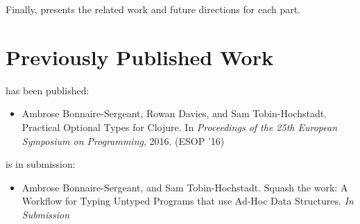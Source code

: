 Finally,  presents the related work and future directions for each part.

\section{Previously Published Work}

 has been published:

\begin{itemize}
  \item Ambrose Bonnaire-Sergeant, Rowan Davies, and Sam Tobin-Hochstadt. 
        Practical Optional Types for Clojure. In
        \emph{Proceedings of the 25th European Symposium on Programming}, 2016.
        (ESOP '16)
\end{itemize}

 is in submission:

\begin{itemize}
  \item Ambrose Bonnaire-Sergeant, and Sam Tobin-Hochstadt.
        Squash the work: A Workflow for Typing Untyped Programs that use Ad-Hoc Data Structures.
        \emph{In Submission}
\end{itemize}

